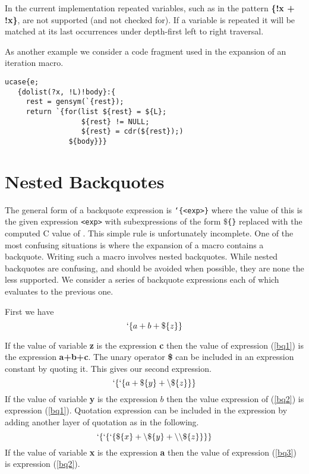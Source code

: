 \documentclass{article}
\begin{document}
In the current implementation repeated variables, such as in the pattern {\bf \{!x + !x\}}, are not supported (and not checked for).
If a variable is repeated it will be matched at its last occurrences under depth-first left to right traversal.

As another example we consider a code fragment used in the expansion of an iteration macro.

\begin{verbatim}
ucase{e;
   {dolist(?x, !L)!body}:{
     rest = gensym(`{rest});
     return `{for(list ${rest} = ${L};
                  ${rest} != NULL;
                  ${rest} = cdr(${rest});)
               ${body}}}
\end{verbatim}

\section{Nested Backquotes}

The general form of a backquote expression is {\tt `\{<exp>\}} where the value of this is the given expression {\tt <exp>} with subexpressions
of the form {\tt $\$$\{<exp2>\}} replaced with the computed C value of {\tt <exp2>}.  This simple rule is unfortunately incomplete.  One of the most
confusing situations is where the expansion of a macro contains a backquote.  Writing such a macro involves nested backquotes.  While nested backquotes
are confusing, and should be avoided when possible, they are none the less supported.  We consider a series of backquote expressions each of which evaluates to the previous one.

First we have
\begin{equation}
\label{bq1}
`\{a+b+\$\{z\}\}
\end{equation}

If the value of variable {\bf z} is the expression {\bf c} then the value of expression (\ref{bq1}) is the expression {\bf a+b+c}.
The unary operator {\bf \$} can be included in an expression constant by quoting it.  This gives our second expression.
\begin{equation}
\label{bq2}
`\{`\{a + \$\{y\} + \backslash\$\{z\}\}\}
\end{equation}
If the value of variable {\bf y} is the expression $b$ then the value expression of (\ref{bq2}) is expression (\ref{bq1}).
Quotation expression can be included in the expression by adding another layer of quotation as in the following.
\begin{equation}
\label{bq3}
`\{`\{`\{\$\{x\} + \backslash\$\{y\} + \backslash\backslash\$\{z\}\}\}\}
\end{equation}
If the value of variable {\bf x} is the expression {\bf a} then the value of expression (\ref{bq3}) is expression (\ref{bq2}).
\end{document}
